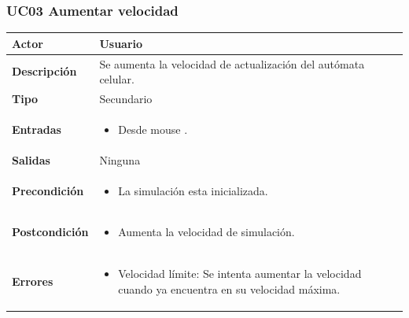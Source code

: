 \subsubsection{UC03 Aumentar velocidad}

\begin{table}[H]
	\begin{center}
		\begin{tabular}{| p{} | p{} |}
			\hline 
			\textbf{Actor} & Usuario \\ \hline
			\textbf{Descripción} & Se aumenta la velocidad de actualización del autómata celular. \\ \hline
			\textbf{Tipo} & Secundario \\ \hline
			\textbf{Entradas} &
			\begin{itemize}[noitemsep, nosep]
				\item Desde mouse \BTN{aumentar_velocidad}.
			\end{itemize}
			\\ \hline
			\textbf{Salidas} & Ninguna \\ \hline
			\textbf{Precondición} & \begin{itemize}[noitemsep, nosep]
				\item La simulación esta inicializada.
			\end{itemize}
			\\ \hline
			\textbf{Postcondición} & \begin{itemize}[noitemsep, nosep]
				\item Aumenta la velocidad de simulación.
			\end{itemize}  \\ \hline
			\textbf{Errores} & 
			\begin{itemize}[noitemsep, nosep]
				\item Velocidad límite: Se intenta aumentar la velocidad cuando ya encuentra en su velocidad máxima.
			\end{itemize}\\ \hline
		\end{tabular}
	\end{center}
\end{table}

